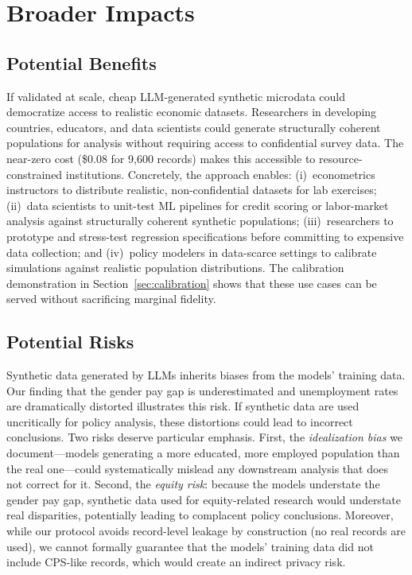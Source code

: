 \documentclass[11pt]{article}
\begin{document}
\section{Broader Impacts}
\label{sec:broader}

\subsection{Potential Benefits}

If validated at scale, cheap LLM-generated synthetic microdata could democratize access to realistic economic datasets.
Researchers in developing countries, educators, and data scientists could generate structurally coherent populations for analysis without requiring access to confidential survey data.
The near-zero cost (\$0.08 for 9{,}600 records) makes this accessible to resource-constrained institutions.
Concretely, the approach enables: (i)~econometrics instructors to distribute realistic, non-confidential datasets for lab exercises; (ii)~data scientists to unit-test ML pipelines for credit scoring or labor-market analysis against structurally coherent synthetic populations; (iii)~researchers to prototype and stress-test regression specifications before committing to expensive data collection; and (iv)~policy modelers in data-scarce settings to calibrate simulations against realistic population distributions.
The calibration demonstration in Section~\ref{sec:calibration} shows that these use cases can be served without sacrificing marginal fidelity.

\subsection{Potential Risks}

Synthetic data generated by LLMs inherits biases from the models' training data.
Our finding that the gender pay gap is underestimated and unemployment rates are dramatically distorted illustrates this risk.
If synthetic data are used uncritically for policy analysis, these distortions could lead to incorrect conclusions.
Two risks deserve particular emphasis.
First, the \emph{idealization bias} we document---models generating a more educated, more employed population than the real one---could systematically mislead any downstream analysis that does not correct for it.
Second, the \emph{equity risk}: because the models understate the gender pay gap, synthetic data used for equity-related research would understate real disparities, potentially leading to complacent policy conclusions.
Moreover, while our protocol avoids record-level leakage by construction (no real records are used), we cannot formally guarantee that the models' training data did not include CPS-like records, which would create an indirect privacy risk.
\end{document}
